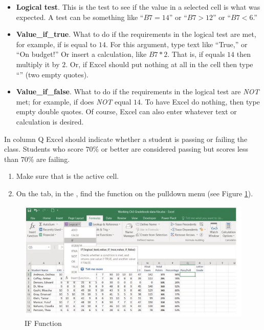 \begin{itemize}
	\item \textbf{Logical test}. This is the test to see if the value in a selected cell is what was expected. A test can be something like ``$ B7=14 $'' or ``$ B7>12 $'' or ``$ B7<6 $.''
	\item \textbf{Value\_if\_true}. What to do if the requirements in the logical test are met, for example, if  is equal to $ 14 $. For this argument, type text like ``True,'' or ``On budget!'' Or insert a calculation, like $ B7*2 $. That is, if  equals $ 14 $ then multiply it by $ 2 $. Or, if Excel should put nothing at all in the cell then type ``'' (two empty quotes).
	\item \textbf{Value\_if\_false}. What to do if the requirements in the logical test are \textit{NOT} met; for example, if  does \textit{NOT} equal $ 14 $. To have Excel do nothing, then type empty double quotes. Of course, Excel can also enter whatever text or calculation is desired.
\end{itemize}

In column Q Excel should indicate whether a student is passing or failing the class. Students who score $ 70\% $ or better are considered passing but scores less than $ 70\% $ are failing.

\begin{enumerate}
	\item Make sure that  is the active cell.
	\item On the  tab, in the , find the  function on the  pulldown menu (see Figure \ref{03:fig09}).
\end{enumerate}

\begin{figure}[H]
	\centering
	\includegraphics[width=\maxwidth{.95\linewidth}]{gfx/ch03_fig09}
	\caption{IF Function}
	\label{03:fig09}
\end{figure}

